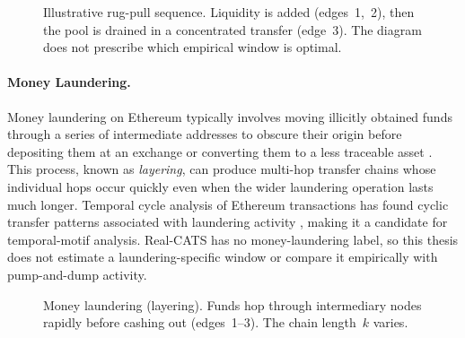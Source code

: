 \begin{figure}[ht]
  \centering
  \caption[Rug pull transfer sequence]{Illustrative rug-pull sequence. Liquidity is
    added (edges~1,~2), then the pool is drained in a concentrated transfer
    (edge~3). The diagram does not prescribe which empirical window is optimal.}
  \label{fig:motif-rugpull}
\end{figure}

\paragraph{Money Laundering.}
Money laundering on Ethereum typically involves moving illicitly obtained funds through a series of intermediate addresses to obscure their origin before depositing them at an exchange or converting them to a less traceable asset \citep{lal2021money}. This process, known as \emph{layering}, can produce multi-hop transfer chains whose individual hops occur quickly even when the wider laundering operation lasts much longer. Temporal cycle analysis of Ethereum transactions has found cyclic transfer patterns associated with laundering activity \citep{lal2021money}, making it a candidate for temporal-motif analysis. Real-CATS has no money-laundering label, so this thesis does not estimate a laundering-specific window or compare it empirically with pump-and-dump activity.

\begin{figure}[ht]
  \centering
  \caption[Money laundering transfer sequence]{Money laundering (layering). Funds hop
    through intermediary nodes rapidly before cashing out (edges~1--3).
    The chain length~$k$ varies.}
  \label{fig:motif-laundering}
\end{figure}

